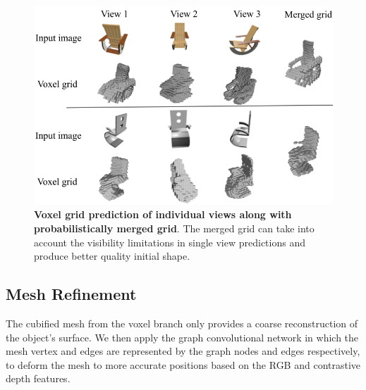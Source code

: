 \begin{figure}[th!]
    \begin{center}
        \includegraphics[width=\linewidth]{imgs/initial_vox.png}
    \end{center}
        \caption{\textbf{Voxel grid prediction of individual views along with probabilistically merged grid}. The merged grid can take into account the visibility limitations in single view predictions and produce better quality initial shape.}
        \label{fig:initial_vox}
\end{figure}

\subsection{Mesh Refinement}
\label{subsec:mesh_refinement}
The cubified mesh from the voxel branch only provides a coarse reconstruction of the object's surface. 
We then apply the graph convolutional network in which the mesh vertex and edges are represented by the graph nodes and edges respectively, to deform the mesh to more accurate positions based on the RGB and contrastive depth features.

\label{subsec:depth_prediction}
